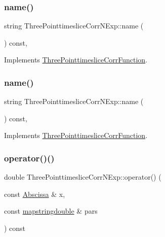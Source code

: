 \subsubsection{\texorpdfstring{name()}{name()}\hspace{0.1cm}{\footnotesize\ttfamily [1/2]}}
{\footnotesize\ttfamily string Three\+Pointtimeslice\+Corr\+N\+Exp\+::name (\begin{DoxyParamCaption}{ }\end{DoxyParamCaption}) const\hspace{0.3cm}{\ttfamily [inline]}, {\ttfamily [virtual]}}



Implements \mbox{\hyperlink{classThreePointtimesliceCorrFunction_ad364af81f908825603c7810afdb7cb2d}{Three\+Pointtimeslice\+Corr\+Function}}.

\mbox{\label{classThreePointtimesliceCorrNExp_aa137e909c6466275f495aac9f2d24178}} 
\subsubsection{\texorpdfstring{name()}{name()}\hspace{0.1cm}{\footnotesize\ttfamily [2/2]}}
{\footnotesize\ttfamily string Three\+Pointtimeslice\+Corr\+N\+Exp\+::name (\begin{DoxyParamCaption}{ }\end{DoxyParamCaption}) const\hspace{0.3cm}{\ttfamily [inline]}, {\ttfamily [virtual]}}



Implements \mbox{\hyperlink{classThreePointtimesliceCorrFunction_ad364af81f908825603c7810afdb7cb2d}{Three\+Pointtimeslice\+Corr\+Function}}.

\mbox{\label{classThreePointtimesliceCorrNExp_a4d3143ae44c362e4dae6221ace8f1c02}} 
\subsubsection{\texorpdfstring{operator()()}{operator()()}\hspace{0.1cm}{\footnotesize\ttfamily [1/4]}}
{\footnotesize\ttfamily double Three\+Pointtimeslice\+Corr\+N\+Exp\+::operator() (\begin{DoxyParamCaption}\item[{const \mbox{\hyperlink{classAbscissa}{Abscissa}} \&}]{x,  }\item[{const \mbox{\hyperlink{lib_2fitting__lib_2includes_8h_a647b481c557c7966517f753340a81d13}{mapstringdouble}} \&}]{pars }\end{DoxyParamCaption}) const\hspace{0.3cm}{\ttfamily [virtual]}}



